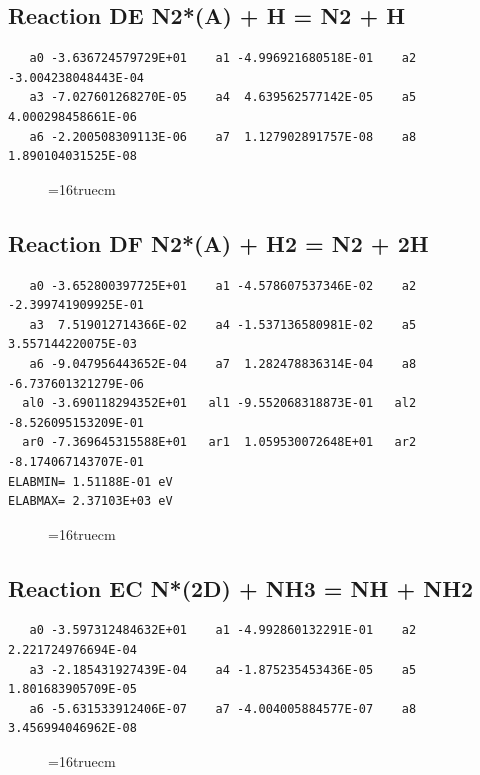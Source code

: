 \documentclass[12pt,dvipdfm]{article}
\begin{document}
\subsection{
Reaction DE N2*(A) + H = N2 + H}
\begin{small}\begin{verbatim}
   a0 -3.636724579729E+01    a1 -4.996921680518E-01    a2 -3.004238048443E-04
   a3 -7.027601268270E-05    a4  4.639562577142E-05    a5  4.000298458661E-06
   a6 -2.200508309113E-06    a7  1.127902891757E-08    a8  1.890104031525E-08
   \end{verbatim}\end{small}
\begin{figure}[h!]
\label{n2rates}
\epsfxsize=16truecm
\end{figure}
\newpage

\subsection{
Reaction DF N2*(A) + H2  = N2 + 2H}
\begin{small}\begin{verbatim}
   a0 -3.652800397725E+01    a1 -4.578607537346E-02    a2 -2.399741909925E-01
   a3  7.519012714366E-02    a4 -1.537136580981E-02    a5  3.557144220075E-03
   a6 -9.047956443652E-04    a7  1.282478836314E-04    a8 -6.737601321279E-06
  al0 -3.690118294352E+01   al1 -9.552068318873E-01   al2 -8.526095153209E-01
  ar0 -7.369645315588E+01   ar1  1.059530072648E+01   ar2 -8.174067143707E-01
ELABMIN= 1.51188E-01 eV
ELABMAX= 2.37103E+03 eV
   \end{verbatim}\end{small}
\begin{figure}[h!]
\label{n2rates}
\epsfxsize=16truecm
\end{figure}
\newpage

\subsection{
Reaction EC N*(2D) + NH3  = NH + NH2}
\begin{small}\begin{verbatim}
   a0 -3.597312484632E+01    a1 -4.992860132291E-01    a2  2.221724976694E-04
   a3 -2.185431927439E-04    a4 -1.875235453436E-05    a5  1.801683905709E-05
   a6 -5.631533912406E-07    a7 -4.004005884577E-07    a8  3.456994046962E-08
   \end{verbatim}\end{small}
\begin{figure}[h!]
\label{n2rates}
\epsfxsize=16truecm
\end{figure}
\newpage
\end{document}
